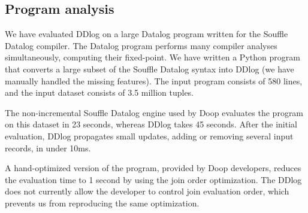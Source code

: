 
\subsection{Program analysis}

We have evaluated DDlog on a large Datalog program written for the
Souffle Datalog compiler.  The Datalog program performs many
compiler analyses simultaneously, computing their fixed-point.  We
have written a Python program that converts a large subset of the
Souffle Datalog syntax into DDlog (we have manually handled the
missing features).  The input program consists of 580 lines, and the
input dataset consists of 3.5 million tuples.

The non-incremental Souffle Datalog engine used by Doop evaluates the
program on this dataset in 23 seconds, whereas DDlog takes 45 seconds.
After the initial evaluation, DDlog propagates small updates, adding or
removing several input records, in under 10ms.  

A hand-optimized version of the program, provided by Doop developers,
reduces the evaluation time to 1 second by using the join order
optimization.  The DDlog does not currently allow the developer to
control join evaluation order, which prevents us from reproducing the
same optimization.


%
